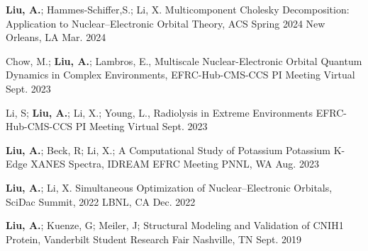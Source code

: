 


\begin{cvpresentations}


\cvpresentation
{\textbf{Liu, A.}; Hammes-Schiffer,S.; Li, X. 
Multicomponent Cholesky Decomposition: Application to Nuclear–Electronic Orbital Theory, 
ACS Spring 2024} %
{New Orleans, LA} %
{Mar. 2024} %


\cvpresentation
{Chow, M.; \textbf{Liu, A.}; Lambros, E.,
Multiscale Nuclear-Electronic Orbital Quantum Dynamics in Complex Environments,
EFRC-Hub-CMS-CCS PI Meeting}
{Virtual} %
{Sept. 2023} %


\cvpresentation
{Li, S; \textbf{Liu, A.}; Li, X.; Young, L.,
Radiolysis in Extreme Environments
EFRC-Hub-CMS-CCS PI Meeting}
{Virtual}
{Sept. 2023} %


\cvpresentation
{\textbf{Liu, A.}; Beck, R; Li, X.;
A Computational Study of Potassium Potassium K-Edge XANES Spectra,
IDREAM EFRC Meeting}
{PNNL, WA} %
{Aug. 2023} %



\cvpresentation
{\textbf{Liu, A.}; Li, X. 
Simultaneous Optimization of Nuclear–Electronic Orbitals, 
SciDac Summit, 2022} %
{LBNL, CA} %
{Dec. 2022} %


\cvpresentation
{\textbf{Liu, A.}; Kuenze, G; Meiler, J;
Structural Modeling and Validation of CNIH1 Protein, 
Vanderbilt Student Research Fair} %
{Nashville, TN} %
{Sept. 2019} %



\end{cvpresentations}
\vspace{-1cm}
